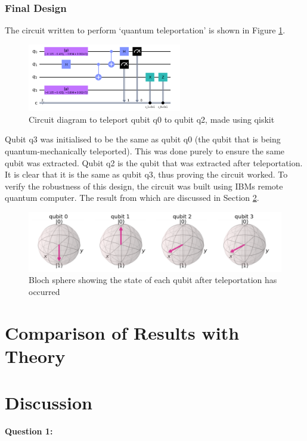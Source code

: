 \subsubsection{Final Design}
The circuit written to perform `quantum teleportation' is shown in Figure \ref{fig:teleportCircuit}.
\begin{figure}[h]
    \centering
    \includegraphics[width=0.6\textwidth]{lab3/images/teleportCircuit.png}
    \caption{Circuit diagram to teleport qubit q0 to qubit q2, made using qiskit}
    \label{fig:teleportCircuit}
\end{figure}
Qubit q3 was initialised to be the same as qubit q0 (the qubit that is being quantum-mechanically teleported). This was done purely to ensure the same qubit was extracted. Qubit q2 is the qubit that was extracted after teleportation. It is clear that it is the same as qubit q3, thus proving the circuit worked. To verify the robustness of this design, the circuit was built using IBMs remote quantum computer. The result from which are discussed in Section \ref{sec:discussTeleport}.

\begin{figure}[h]
    \centering
    \includegraphics[width=\textwidth]{lab3/images/teleportBloch.png}
    \caption{Bloch sphere showing the state of each qubit after teleportation has occurred}
    \label{fig:teleportBloch}
\end{figure}

\section{Comparison of Results with Theory}
\section{Discussion} \label{sec:discussTeleport}
\textbf{Question 1:}

